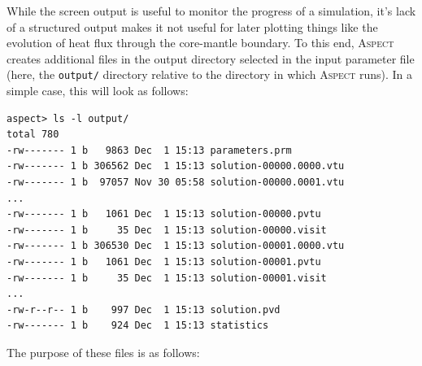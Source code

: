 \documentclass{article}
\newcommand{\aspect}{\textsc{Aspect}}
\begin{document}
While the screen output is useful to monitor the progress of a simulation,
it's lack of a structured output makes it not useful for later plotting things
like the evolution of heat flux through the core-mantle boundary. To this end,
\aspect{} creates additional files in the output directory selected in the
input parameter file
(here, the \texttt{output/} directory relative to the
directory in which \aspect{} runs). In a simple case, this will look as
follows:
\begin{lstlisting}[frame=single,language=ksh]
aspect> ls -l output/
total 780
-rw------- 1 b   9863 Dec  1 15:13 parameters.prm
-rw------- 1 b 306562 Dec  1 15:13 solution-00000.0000.vtu
-rw------- 1 b  97057 Nov 30 05:58 solution-00000.0001.vtu
...
-rw------- 1 b   1061 Dec  1 15:13 solution-00000.pvtu
-rw------- 1 b     35 Dec  1 15:13 solution-00000.visit
-rw------- 1 b 306530 Dec  1 15:13 solution-00001.0000.vtu
-rw------- 1 b   1061 Dec  1 15:13 solution-00001.pvtu
-rw------- 1 b     35 Dec  1 15:13 solution-00001.visit
...
-rw-r--r-- 1 b    997 Dec  1 15:13 solution.pvd
-rw------- 1 b    924 Dec  1 15:13 statistics
\end{lstlisting}
The purpose of these files is as follows:
\end{document}

